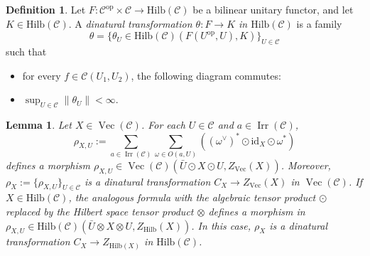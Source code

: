 \documentclass[a4paper,11pt,reqno]{amsart}
\numberwithin{equation}{section}
\newtheorem{lemma}[theorem]{Lemma}
\theoremstyle{remark}
\theoremstyle{definition}
\newtheorem{definition}[theorem]{Definition}
\newcommand{\cC}{\mathcal C}
\DeclareMathOperator{\Irr}{Irr}
\DeclareMathOperator{\Vect}{Vec}
\newcommand\op{\text{op}}
\newcommand{\id}{\mathrm{id}}
\newcommand{\Hilb}{\mathrm{Hilb}}
\begin{document}
\begin{definition}
	Let $F: \cC^{\op} \times \cC \to \Hilb(\cC)$ be a bilinear unitary functor, and let $K \in \Hilb(\cC)$. A {\em dinatural transformation $\theta: F \to K$ in $\Hilb(\cC)$} is a family 
	\[
	\theta = \{ \theta_U \in \Hilb(\cC)(F(U^{\op},U) , K)\}_{U \in \cC}
	\]
	such that 
	\begin{itemize}
		\item for every $f \in \cC(U_1,U_2)$, the following diagram commutes:
		\begin{center}
		\end{center}
		
		\item $\sup_{U \in \cC} \| \theta_U\| < \infty$.
	\end{itemize}
	
	\label{def:dinaturaltransfinHilb}
\end{definition}

\begin{lemma}
	Let $X \in \Vect(\cC)$. For each $U \in \cC$ and $a \in \Irr(\cC)$,  
	\[
	\rho_{X,U} :=  \sum_{a \in \Irr(\cC)} \sum_{\omega \in O(a,U)} ((\omega^\vee)^* \odot \id_X \odot \omega^*)
	\]
	defines a morphism $\rho_{X,U} \in \Vect(\cC)(\bar{U} \odot X \odot U, Z_{\Vect}(X))$. Moreover, $\rho_X:= \{\rho_{X,U}\}_{U \in \cC}$ is a dinatural transformation $C_X \to Z_{\Vect}(X)$ in $\Vect(\cC)$. If $X \in \Hilb(\cC)$, the analogous  formula with the algebraic tensor product $\odot$ replaced by the Hilbert space tensor product $\otimes$ defines a morphism in $ \rho_{X,U} \in \Hilb(\cC)(\bar{U} \otimes X \otimes U, Z_{\Hilb}(X))$. In this case, $\rho_X$ is a dinatural transformation $C_X \to Z_{\Hilb(X)}$ in $\Hilb(\cC)$.
	\label{lemma:centraldinaturaltransformation}
\end{lemma}
\end{document}
